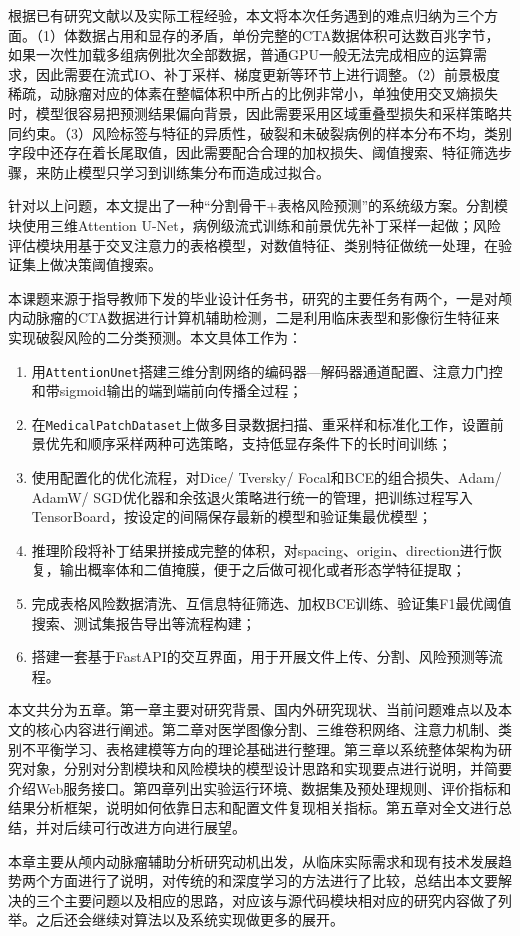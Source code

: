 
根据已有研究文献以及实际工程经验，本文将本次任务遇到的难点归纳为三个方面。（1）体数据占用和显存的矛盾，单份完整的CTA数据体积可达数百兆字节，如果一次性加载多组病例批次全部数据，普通GPU一般无法完成相应的运算需求，因此需要在流式IO、补丁采样、梯度更新等环节上进行调整。（2）前景极度稀疏，动脉瘤对应的体素在整幅体积中所占的比例非常小，单独使用交叉熵损失时，模型很容易把预测结果偏向背景，因此需要采用区域重叠型损失和采样策略共同约束。（3）风险标签与特征的异质性，破裂和未破裂病例的样本分布不均，类别字段中还存在着长尾取值，因此需要配合合理的加权损失、阈值搜索、特征筛选步骤，来防止模型只学习到训练集分布而造成过拟合。

针对以上问题，本文提出了一种“分割骨干+表格风险预测”的系统级方案。分割模块使用三维Attention U-Net，病例级流式训练和前景优先补丁采样一起做；风险评估模块用基于交叉注意力的表格模型，对数值特征、类别特征做统一处理，在验证集上做决策阈值搜索。


本课题来源于指导教师下发的毕业设计任务书，研究的主要任务有两个，一是对颅内动脉瘤的CTA数据进行计算机辅助检测，二是利用临床表型和影像衍生特征来实现破裂风险的二分类预测。本文具体工作为：

\begin{enumerate}
\item 用\texttt{AttentionUnet}搭建三维分割网络的编码器—解码器通道配置、注意力门控和带sigmoid输出的端到端前向传播全过程；
\item 在\texttt{MedicalPatchDataset}上做多目录数据扫描、重采样和标准化工作，设置前景优先和顺序采样两种可选策略，支持低显存条件下的长时间训练；
\item 使用配置化的优化流程，对Dice/ Tversky/ Focal和BCE的组合损失、Adam/ AdamW/ SGD优化器和余弦退火策略进行统一的管理，把训练过程写入TensorBoard，按设定的间隔保存最新的模型和验证集最优模型；
\item 推理阶段将补丁结果拼接成完整的体积，对spacing、origin、direction进行恢复，输出概率体和二值掩膜，便于之后做可视化或者形态学特征提取；
\item 完成表格风险数据清洗、互信息特征筛选、加权BCE训练、验证集F1最优阈值搜索、测试集报告导出等流程构建；
\item 搭建一套基于FastAPI的交互界面，用于开展文件上传、分割、风险预测等流程。
\end{enumerate}


本文共分为五章。第一章主要对研究背景、国内外研究现状、当前问题难点以及本文的核心内容进行阐述。第二章对医学图像分割、三维卷积网络、注意力机制、类别不平衡学习、表格建模等方向的理论基础进行整理。第三章以系统整体架构为研究对象，分别对分割模块和风险模块的模型设计思路和实现要点进行说明，并简要介绍Web服务接口。第四章列出实验运行环境、数据集及预处理规则、评价指标和结果分析框架，说明如何依靠日志和配置文件复现相关指标。第五章对全文进行总结，并对后续可行改进方向进行展望。


本章主要从颅内动脉瘤辅助分析研究动机出发，从临床实际需求和现有技术发展趋势两个方面进行了说明，对传统的和深度学习的方法进行了比较，总结出本文要解决的三个主要问题以及相应的思路，对应该与源代码模块相对应的研究内容做了列举。之后还会继续对算法以及系统实现做更多的展开。